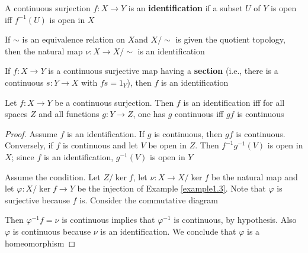\documentclass[11pt]{article}
\begin{document}
\begin{definition}[]
A continuous surjection \(f:X\to Y\) is an \textbf{identification} if a subset \(U\) of \(Y\) is open
iff \(f^{-1}(U)\) is open in \(X\)
\end{definition}

\begin{examplle}[]
If \(\sim\) is an equivalence relation on \(X\)and \(X/\sim\) is given the quotient topology, then the
natural map \(\nu:X\to X/\sim\) is an identification
\end{examplle}

\begin{examplle}[]
If \(f:X\to Y\) is a continuous surjective map having a \textbf{section} (i.e., there is a continuous \(s:Y\to X\)
with \(fs=1_Y\)), then \(f\) is an identification
\end{examplle}

\begin{theorem}[]
\label{thm1.8}
Let \(f:X\to Y\) be a continuous surjection. Then \(f\) is an identification iff for all
spaces \(Z\) and all functions \(g:Y\to Z\), one has \(g\) continuous iff \(gf\) is continuous
\begin{center}\end{center}
\end{theorem}

\begin{proof}
Assume \(f\) is an identification. If \(g\) is continuous, then \(gf\) is continuous. Conversely,
if \(f\) is continuous and let \(V\)  be open in \(Z\). Then \(f^{-1}g^{-1}(V)\) is open
in \(X\); since \(f\) is an identification, \(g^{-1}(V)\) is open in \(Y\)

Assume the condition. Let \(Z/\ker f\), let \(\nu:X\to X/\ker f\) be the natural map and
let \(\varphi:X/\ker f\to Y\) be the injection of Example \ref{example1.3}. Note that \(\varphi\) is surjective
because \(f\) is. Consider the commutative diagram
\begin{center}\end{center}
Then \(\varphi^{-1}f=\nu\) is continuous implies that \(\varphi^{-1}\) is continuous, by hypothesis. Also
\(\varphi\) is continuous because \(\nu\) is an identification. We conclude that \(\varphi\) is a homeomorphism
\end{proof}
\end{document}
